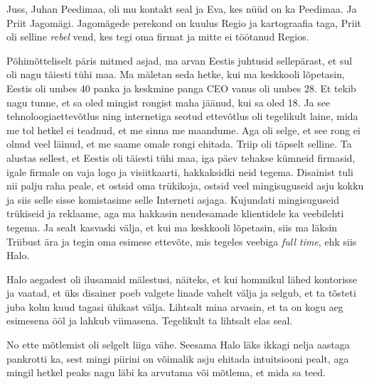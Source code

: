 
Juss, Juhan Peedimaa, oli mu kontakt seal ja Eva, 
kes nüüd on ka Peedimaa. Ja Priit 
Jagomägi. Jagomägede perekond on kuulus Regio ja 
kartograafia taga, Priit oli selline \emph{rebel} vend, kes tegi oma firmat ja 
mitte ei töötanud Regios. 

Põhimõtteliselt päris mitmed asjad, ma arvan Eestis juhtusid  sellepärast, et 
sul oli nagu täiesti tühi maa. Ma mäletan seda hetke, kui ma keskkooli 
lõpetasin, Eestis oli umbes 40 panka ja keskmine panga CEO vanus oli umbes 28. 
Et tekib nagu tunne, et sa oled mingist rongist maha jäänud, kui sa oled 18. Ja 
see tehnoloogiaettevõtlus ning internetiga seotud ettevõtlus oli tegelikult  
laine, mida me tol hetkel ei teadnud, et me sinna me maandume. Aga  oli selge, 
et see rong ei olnud veel läinud, et me saame omale rongi ehitada. 
Triip oli täpselt selline. Ta alustas sellest, et Eestis oli 
täiesti tühi maa, iga päev tehakse kümneid firmasid, igale firmale on vaja logo 
ja visiitkaarti,  hakkaksidki neid tegema. Disainist tuli nii palju raha peale, 
et ostsid oma trükikoja, ostsid veel mingisuguseid asju kokku ja siis selle 
sisse komistasime selle Interneti asjaga. Kujundati mingisuguseid trükiseid ja 
reklaame, aga ma hakkasin nendesamade klientidele ka veebilehti tegema. Ja 
sealt kasvaski välja, et kui ma keskkooli lõpetasin, siis ma läksin Triibust 
ära ja tegin oma esimese ettevõte, mis tegeles veebiga \emph{full time}, ehk 
siis Halo. 

Halo aegadest oli ilusamaid mälestusi, näiteks, et kui hommikul lähed 
kontorisse ja  vaatad, et üks disainer poeb valgete linade vahelt välja ja 
selgub, et ta tõsteti juba kolm kuud tagasi ühikast välja. Lihtsalt mina 
arvasin, et ta on kogu aeg esimesena ööl ja lahkub viimasena. Tegelikult ta 
lihtsalt elas seal.


No ette mõtlemist oli selgelt liiga vähe. Seesama Halo läks ikkagi nelja 
aastaga pankrotti ka, sest mingi piirini  on võimalik asju ehitada intuitsiooni 
pealt, aga mingil hetkel peaks nagu läbi ka arvutama või mõtlema, et mida sa 
teed. 

